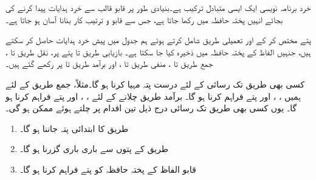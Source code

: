 خرد برنامہ نویسی ایک ایسی  متبادل ترکیب ہے۔بنیادی طور پر  قابو قالب سے خرد ہدایات پیدا کرنے کی بجائے انہیں پختہ حافظہ میں رکھا جاتا ہے، جس  سے  قابو و ترتیب کار بنانا   آسان ہو جاتا ہے۔

پتے مختص کر کے  اور تعمیلی طریق شامل کرتے ہوئے ہم جدول  میں پیش خرد ہدایات حاصل کر سکتے ہیں، جنہیں  الفاظ کے پختہ حافظہ میں ذخیرہ کیا جا سکتا ہے۔  بازیابی  طریق   تا  پتے پر، نقل طریق  تا ، جمع طریق  تا ، منفی طریق  تا ، اور  برآمد طریق  تا  پر رکھے گئے ہیں۔

کسی بھی طریق تک رسائی کے لئے  درست پتہ  مہیا کرنا ہو گا۔مثلاً، جمع طریق   کے لئے ہمیں ، ، اور  پتے فراہم کرنا ہو گا۔ برآمد طریق چلانے کے لئے ، ، اور  پتے فراہم کرنا ہو گا۔ یوں کسی بھی طریق تک رسائی درج ذیل تین اقدام پر چلتے ہوئے ممکن ہو گی۔
\begin{enumerate}[1.]
\item
طریق کا ابتدائی پتہ  جاننا ہو گا۔
\item
طریق کے پتوں سے  باری باری   گزرنا ہو گا۔
\item
 قابو الفاظ کے پختہ حافظہ کو پتے  فراہم کرنا ہو گا۔
\end{enumerate}

